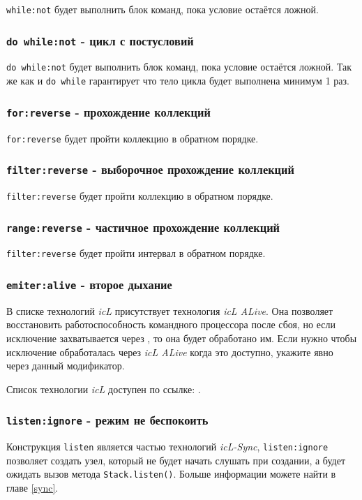 \lstinline|while:not| будет выполнить блок команд, пока условие остаётся ложной.

\subsubsection{\lstinline|do while:not| - цикл с постусловий}

\lstinline|do while:not| будет выполнить блок команд, пока условие остаётся ложной. Так же как и \lstinline|do while| гарантирует что тело цикла будет выполнена минимум 1 раз.

\subsubsection{\lstinline|for:reverse| - прохождение коллекций}

\lstinline|for:reverse| будет пройти коллекцию в обратном порядке.

\subsubsection{\lstinline|filter:reverse| - выборочное прохождение коллекций}

\lstinline|filter:reverse| будет пройти коллекцию в обратном порядке.

\subsubsection{\lstinline|range:reverse| - частичное прохождение коллекций}

\lstinline|filter:reverse| будет пройти интервал в обратном порядке.

\subsubsection{\lstinline|emiter:alive| - второе дыхание}

В списке технологий \textit{icL} присутствует технология \textit{icL ALive}. Она позволяет восстановить работоспособность командного процессора после сбоя, но если исключение захватывается через , то она будет обработано им. Если нужно чтобы исключение обработалась через \textit{icL ALive} когда это доступно, укажите явно через данный модификатор.

Список технологии \textit{icL} доступен по ссылке: .

\subsubsection{\lstinline|listen:ignore| - режим не беспокоить}

Конструкция \lstinline|listen| является частью технологий \textit{icL-Sync}, \lstinline|listen:ignore| позволяет создать узел, который не будет начать слушать при создании, а будет ожидать вызов метода \lstinline|Stack.listen()|. Больше информации можете найти в главе \ref{sync}. 
